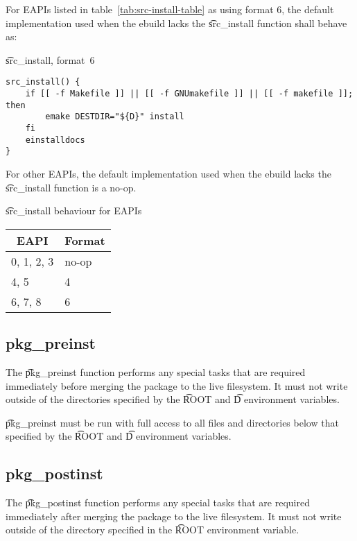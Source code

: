  For EAPIs listed in table~\ref{tab:src-install-table} as using format
6, the default implementation used when the ebuild lacks the \t{src_install} function shall behave
as:

\begin{listing}[H]
\caption{\t{src_install}, format~6}
\begin{verbatim}
src_install() {
    if [[ -f Makefile ]] || [[ -f GNUmakefile ]] || [[ -f makefile ]]; then
        emake DESTDIR="${D}" install
    fi
    einstalldocs
}
\end{verbatim}
\end{listing}

For other EAPIs, the default implementation used when the ebuild lacks the \t{src_install} function
is a no-op.

\begin{centertable}{\t{src_install} behaviour for EAPIs}
    \label{tab:src-install-table}
    \begin{tabular}{ll}
      \toprule
      \multicolumn{1}{c}{\textbf{EAPI}} &
      \multicolumn{1}{c}{\textbf{Format}} \\
      \midrule
      0, 1, 2, 3        & no-op \\
      4, 5              & 4     \\
      6, 7, 8           & 6     \\
      \bottomrule
    \end{tabular}
\end{centertable}

\subsection{pkg_preinst}

The \t{pkg_preinst} function performs any special tasks that are required immediately before
merging the package to the live filesystem. It must not write outside of the directories specified
by the \t{ROOT} and \t{D} environment variables.

\t{pkg_preinst} must be run with full access to all files and directories below that specified by
the \t{ROOT} and \t{D} environment variables.

\subsection{pkg_postinst}

The \t{pkg_postinst} function performs any special tasks that are required immediately after
merging the package to the live filesystem. It must not write outside of the directory specified
in the \t{ROOT} environment variable.

